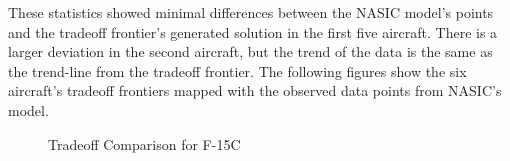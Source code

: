 These statistics showed minimal differences between the NASIC model's points and the tradeoff frontier's generated solution in the first five aircraft. There is a larger deviation in the second aircraft, but the trend of the data is the same as the trend-line from the tradeoff frontier. The following figures show the six aircraft's tradeoff frontiers mapped with the observed data points from NASIC's model.
\begin{figure}%
    \centering
    \qquad
    \qquad
    \caption{Tradeoff Comparison for F-15C}%
    \label{fig:tradef15}
\end{figure}

